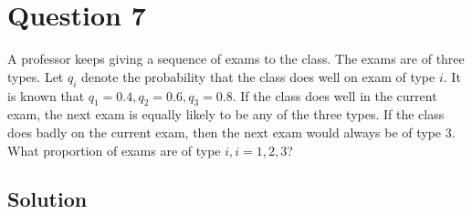 \section*{Question 7}

A professor keeps giving a sequence of exams to the class.
The exams are of three types.
Let \( q_{i} \) denote the probability that the class does well on exam of type \( i \).
It is known that \( q_{1}=0.4, q_{2}=0.6, q_{3}=0.8 \).
If the class does well in the current exam, the next exam is equally likely to be any of the three types.
If the class does badly on the current exam, then the next exam would always be of type 3.
What proportion of exams are of type \( i, i=1,2,3 \)?

\subsection*{Solution}
